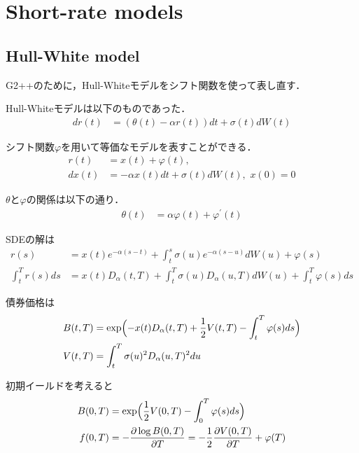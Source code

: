 \documentclass[11pt,a4paper]{jsarticle}
\begin{document}
\setcounter{section}{2}
\section{Short-rate models}
\setcounter{subsection}{4}
\setcounter{assumption}{7}
\setcounter{exercise}{8}
\subsection{Hull-White model}
G2++のために，Hull-Whiteモデルをシフト関数を使って表し直す．

Hull-Whiteモデルは以下のものであった．
\begin{align}
dr(t)
& =
(\theta(t) - \alpha r(t)) dt + \sigma(t) dW(t) \nonumber
\end{align}

シフト関数$\varphi$を用いて等価なモデルを表すことができる．
\begin{align}
r(t)
& =
x(t) + \varphi(t), \nonumber \\
dx(t)
& =
- \alpha x(t) dt + \sigma(t) dW(t), \,\, x(0) = 0 \nonumber
\end{align}

$\theta$と$\varphi$の関係は以下の通り．
\begin{align}
\theta(t)
& =
\alpha \varphi(t) + \varphi^{\prime} (t) \nonumber
\end{align}

SDEの解は
\begin{align}
r(s)
& =
x(t) e^{-\alpha (s - t)} + \int_t^s \sigma(u) e^{-\alpha (s - u)} d W(u) + \varphi(s) \nonumber \\
\int_t^T r(s) ds
& =
x(t) D_\alpha (t, T) + \int_t^T \sigma(u) D_\alpha (u, T) d W(u) + \int_t^T \varphi(s) ds \nonumber
\end{align}

債券価格は
\begin{align}
B(t, T)
& =
\exp \Bigl( -x(t) D_\alpha (t, T) + \frac{1}{2} V(t, T) - \int_t^T \varphi(s) ds \Bigr) \nonumber \\
V(t, T)
& =
\int_t^T \sigma(u)^2 D_\alpha (u, T)^2 du \nonumber
\end{align}

初期イールドを考えると
\begin{align}
B(0, T)
& =
\exp \Bigl( \frac{1}{2} V(0, T) - \int_0^T \varphi(s) ds \Bigr) \nonumber \\
f (0, T)
& =
- \frac{\partial \log B(0, T)}{\partial T}
= -\frac{1}{2} \frac{\partial V(0, T)}{\partial T} + \varphi(T) \nonumber
\end{align}
\end{document}
